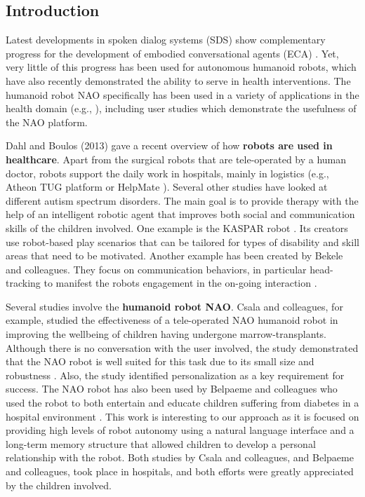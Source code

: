 \documentclass[letterpaper]{article}
\begin{document}
\begin{sloppy}
\section{Introduction} \label{intro}

Latest developments in spoken dialog systems (SDS) show complementary progress for the development 
of  embodied conversational agents (ECA) \cite{YASCLL14}. Yet, very little of
this progress has been used for autonomous humanoid robots, which have also recently demonstrated 
the ability
to serve in health interventions. The
humanoid robot NAO specifically has been used in a variety of applications in the health domain 
(e.g.,
\cite{MAJA13}), including user studies which demonstrate the usefulness of the NAO platform.

Dahl and Boulos (2013) \nocite{robotics3010001} gave a recent overview of how {\bf robots are used 
in
healthcare}. Apart from the  surgical robots that are tele-operated by a human doctor, robots 
support
the daily work in hospitals, mainly in logistics (e.g., Atheon TUG platform \cite{bloss2011mobile}
or HelpMate \cite{evans1998helpmate}). Several other studies have looked at different autism
spectrum disorders. The main goal is to provide therapy with the help of an intelligent robotic
agent that improves both social and communication skills of the children involved. One example is
the KASPAR robot \cite{robins2012scenarios}. Its creators use robot-based play scenarios that can
be tailored for types of disability and skill areas that need to be motivated. Another example has
been created by Bekele and colleagues. They focus on communication behaviors, in particular
head-tracking to manifest the robots engagement in the on-going interaction \cite{bekele2013step}.  


Several studies involve the {\bf humanoid robot NAO}. Csala and colleagues, for example,
studied the effectiveness of a tele-operated NAO humanoid robot in improving the wellbeing of
children having undergone marrow-transplants. Although there is no conversation with the user
involved, the study demonstrated that the NAO robot is well suited for this task due to its small
size and robustness \cite{Csala2012}. Also, the study identified personalization as a key
requirement for success. The NAO robot has also been used by Belpaeme and colleagues who used the
robot to both entertain and educate children suffering from diabetes in a hospital environment
\cite{belpaeme2012multimodal}. This work is interesting to our approach as it is focused on
providing high levels of robot autonomy using a natural language interface and a long-term memory
structure that allowed children to develop a personal relationship with the robot. Both studies by
Csala and colleagues, and Belpaeme and colleagues, took place in hospitals, and both efforts were
greatly appreciated by the children involved.


\end{sloppy}
\end{document}
